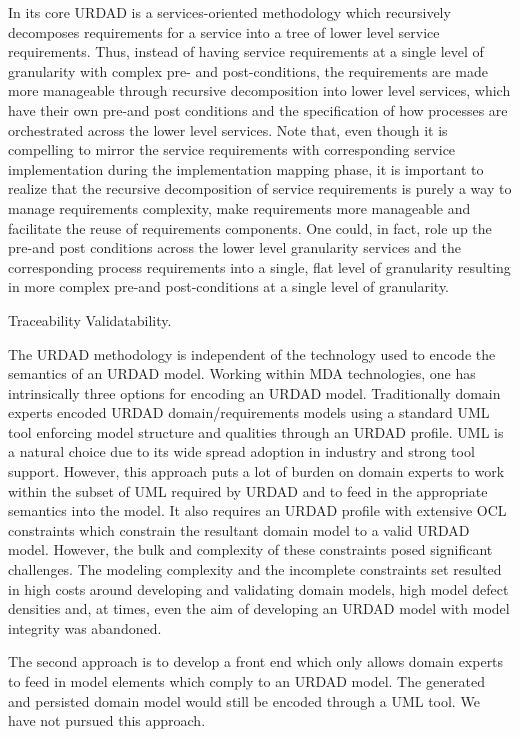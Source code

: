 In its core URDAD is a services-oriented methodology which recursively decomposes requirements for a service into a tree of lower level service requirements. Thus, instead of having service requirements at a single level of granularity with complex pre- and post-conditions, the requirements are made more manageable through recursive decomposition into lower level services, which have their own pre-and post conditions and the specification of how processes are orchestrated across the lower level services. Note that, even though it is compelling to mirror the service requirements with corresponding service implementation during the implementation mapping phase, it is important to realize that the recursive decomposition of service requirements is purely a way to manage requirements complexity, make requirements more manageable and facilitate the reuse of requirements components. One could, in fact, role up the pre-and post conditions across the lower level granularity services and the corresponding process requirements into a single, flat level of granularity resulting in more complex pre-and post-conditions at a single level of granularity.

Traceability
Validatability.


The URDAD methodology is independent of the technology used to encode the semantics of an URDAD model. Working within MDA technologies, one has intrinsically three options for encoding an URDAD model. Traditionally domain experts encoded URDAD domain/requirements models using a standard UML tool enforcing model structure and qualities through an URDAD profile. UML is a natural choice due to its wide spread adoption in industry and strong tool support. However, this approach puts a lot of burden on domain experts to work within the subset of UML required by URDAD and to feed in the appropriate semantics into the model. It also requires an URDAD profile with extensive OCL constraints which constrain the resultant domain model to a valid URDAD model. However, the bulk and complexity of these constraints posed significant challenges. The modeling complexity and the incomplete constraints set resulted in high costs around developing and validating domain models, high model defect densities and, at times, even the aim of developing an URDAD model with model integrity was abandoned.

The second approach is to develop a front end which only allows domain experts to feed in model elements which comply to an URDAD model. The generated and persisted domain model would still be encoded through a UML tool. We have not pursued this approach.

